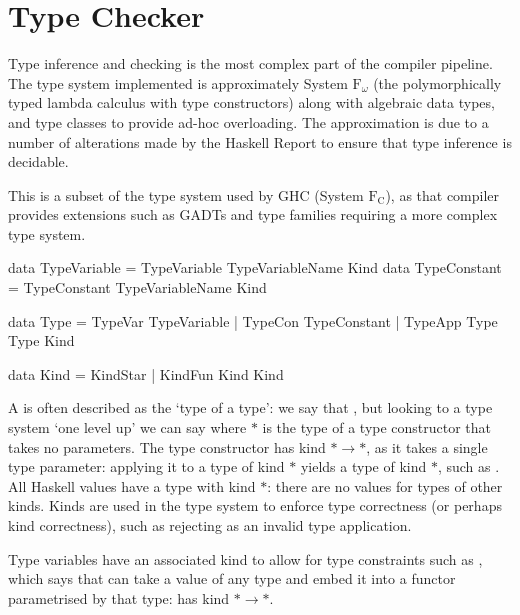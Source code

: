 \documentclass[dissertation.tex]{subfiles}
\begin{document}
\section{Type Checker}
{

    Type inference and checking is the most complex part of the compiler pipeline. The type system implemented is
    approximately System \(\text{F}_\omega\) (the polymorphically typed lambda calculus with type constructors) along
    with algebraic data types, and type classes to provide ad-hoc overloading. The approximation is due to a number of
    alterations made by the Haskell Report to ensure that type inference is decidable.
    
    This is a subset of the type system used by GHC (System \(\text{F}_\text{C}\)), as that compiler provides extensions
    such as GADTs and type families requiring a more complex type system.

    \begin{haskellfigure}
    data TypeVariable = TypeVariable TypeVariableName Kind
    data TypeConstant = TypeConstant TypeVariableName Kind

    data Type = TypeVar TypeVariable
                | TypeCon TypeConstant
                | TypeApp Type Type Kind

    data Kind = KindStar
                | KindFun Kind Kind
    \end{haskellfigure}

    A  is often described as the `type of a type': we say that , but looking to a
    type system `one level up' we can say  where \(*\) is the type of a type constructor that
    takes no parameters. The type constructor  has kind \(*\rightarrow*\), as it takes a single type
    parameter: applying it to a type of kind \(*\) yields a type of kind \(*\), such as . All Haskell
    values have a type with kind \(*\): there are no values for types of other kinds. Kinds are used in the type system
    to enforce type correctness (or perhaps kind correctness), such as rejecting  as an invalid type
    application.

    Type variables have an associated kind to allow for type constraints such as , which says that  can take a value of any type and embed it into a
    functor parametrised by that type:  has kind \(*\rightarrow*\).

}
\end{document}
